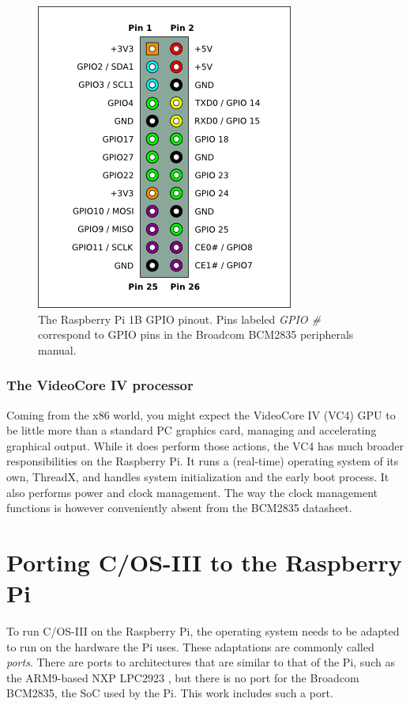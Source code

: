 \documentclass[twoside]{uva-inf-bachelor-thesis}
\newcommand{\ucosiii}{\textmu C/OS-III\xspace}
\begin{document}
\begin{figure}[ht]
    \centering
    \includegraphics[scale=0.5]{Pi-GPIO-header-26-sm.png}
    \caption{The Raspberry Pi 1B GPIO pinout. Pins labeled \textit{GPIO \#} correspond to GPIO pins in the Broadcom BCM2835 peripherals manual\cite{bcm:2835peripherals}.}
    \label{fig:gpiopinout}
\end{figure}

\subsection{The VideoCore IV processor}
Coming from the x86 world, you might expect the VideoCore IV (VC4) GPU to be little more than a standard PC graphics card, managing and accelerating graphical output. While it does perform those actions, the VC4 has much broader responsibilities on the Raspberry Pi. It runs a (real-time) operating system of its own, ThreadX\cite{rpi:opensourcevpu}, and handles system initialization and the early boot process\cite{rpi:bootforum}. It also performs power and clock management\cite{rpi:gpuclockpower}. The way the clock management functions is however conveniently absent from the BCM2835 datasheet.

%
%
%
%

\chapter{Porting \ucosiii to the Raspberry Pi}
To run \ucosiii on the Raspberry Pi, the operating system needs to be adapted to run on the hardware the Pi uses. These adaptations are commonly called \textit{ports}. There are ports to architectures that are similar to that of the Pi, such as the ARM9-based NXP LPC2923 \cite{micrium:nxplpc}, but there is no port for the Broadcom BCM2835, the SoC used by the Pi. This work includes such a port.
\end{document}
